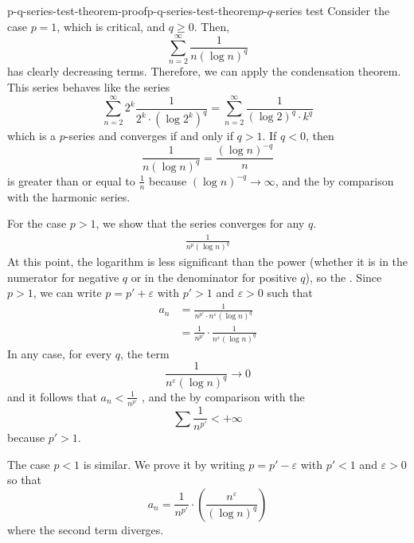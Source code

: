 \documentclass[preview]{standalone}
\begin{document}
\begin{snippetproof}{p-q-series-test-theorem-proof}{p-q-series-test-theorem}{\(p\text{-}q\)-series test}
    Consider the case \(p=1\), which is critical, and \(q \geq 0\).
    Then,
    \[
        \sum_{n=2}^\infty \frac{1}{n {\left(\log n\right)}^q}
    \]
    has clearly decreasing terms. Therefore, we can apply the condensation theorem.
    This series behaves like the series
    \[
        \sum_{n=2}^\infty 2^k \frac{1}{2^k \cdot {\left(\log 2^k\right)}^q}
        = \sum_{n=2}^\infty \frac{1}{{\left(\log 2\right)}^q \cdot k^q}
    \]
    which is a \(p\)-series and converges if and only if \(q > 1\).
    If \(q < 0\), then
    \[
        \frac{1}{n{(\log n)}^q} = \frac{{(\log n)}^{-q}}{n}
    \]
    is \eventually greater than or equal to \(\frac{1}{n}\) because \({(\log n)}^{-q} \to \infty\), and the \series
    \seriesdiverges by comparison with the harmonic series.

    For the case \(p > 1\), we show that the series converges for any \(q\).
    \begin{align*}
        \frac{
            1
        }{
            n^p {(\log n)}^q
        }
    \end{align*}
    At this point, the logarithm is less significant than the power (whether it is in the numerator for negative \(q\) or in the denominator for positive \(q\)), so the \series \seriesconverges.
    Since \(p > 1\), we can write \(p = p' + \varepsilon\)
    with \(p' > 1\) and \(\varepsilon > 0\) such that
    \begin{align*}
        a_n &= \frac{1}{n^{p'}\cdot n^\varepsilon {(\log n)}^q} \\
        &= \frac{1}{n^{p'}} \cdot \frac{1}{n^\varepsilon {(\log n)}^q}
    \end{align*}
    In any case, for every \(q\), the term
    \[
        \frac{1}{n^\varepsilon {(\log n)}^q} \to 0
    \]
    and it follows that \(a_n < \frac{1}{n^{p'}}\) \eventually, and the \series
    \seriesconverges by comparison with the \series
    \[
        \sum \frac{1}{n^{p'}} < +\infty
    \]
    because \(p' > 1\).

    The case \(p < 1\) is similar. We prove it by writing \(p = p' - \varepsilon\)
    with \(p' < 1\) and \(\varepsilon > 0\) so that
    \[
        a_n = \frac{1}{n^{p'}} \cdot \left(
            \frac{n^\varepsilon}{{(\log n)}^q}
        \right)
    \]
    where the second term diverges.
\end{snippetproof}
\end{document}
